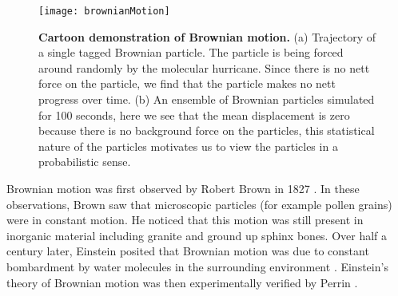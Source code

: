 \begin{figure}
	\texttt{[image: brownianMotion]}
	\caption{\textbf{Cartoon demonstration of Brownian motion.} (a) Trajectory of a single tagged Brownian particle. The particle is being forced around randomly by the molecular hurricane. Since there is no nett force on the particle, we find that the particle makes no nett progress over time. (b) An ensemble of Brownian particles simulated for 100 seconds, here we see that the mean displacement is zero because there is no background force on the particles, this statistical nature of the particles motivates us to view the particles in a probabilistic sense.
\label{fig:brownianMotion}}
\end{figure}


Brownian motion was first observed by Robert Brown in 1827 \cite{Brown1828}. In these observations, Brown saw that microscopic particles (for example pollen grains) were in constant motion. He noticed that this motion was still present in inorganic material including granite and ground up sphinx bones.
Over half a century later, Einstein posited that Brownian motion was due to constant bombardment by water molecules in the surrounding environment \cite{Einstein1905}. Einstein's theory of Brownian motion was then experimentally verified by Perrin \cite{Perrin2013}.

